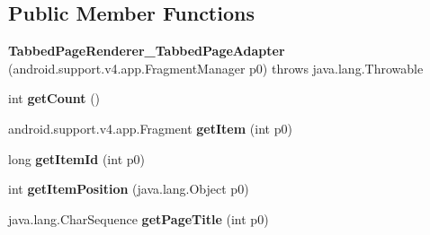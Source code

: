 \subsection*{Public Member Functions}
\begin{DoxyCompactItemize}
\item 
\hypertarget{classmd5eb25e0c6f853c9e5104b7654c9dc6cdf_1_1TabbedPageRenderer__TabbedPageAdapter_a1cabd962fd31ae12c29e786f239e9d92}{}{\bfseries Tabbed\+Page\+Renderer\+\_\+\+Tabbed\+Page\+Adapter} (android.\+support.\+v4.\+app.\+Fragment\+Manager p0)  throws java.\+lang.\+Throwable 	\label{classmd5eb25e0c6f853c9e5104b7654c9dc6cdf_1_1TabbedPageRenderer__TabbedPageAdapter_a1cabd962fd31ae12c29e786f239e9d92}

\item 
\hypertarget{classmd5eb25e0c6f853c9e5104b7654c9dc6cdf_1_1TabbedPageRenderer__TabbedPageAdapter_af9472693b63b54f3935d3908c0be6a4f}{}int {\bfseries get\+Count} ()\label{classmd5eb25e0c6f853c9e5104b7654c9dc6cdf_1_1TabbedPageRenderer__TabbedPageAdapter_af9472693b63b54f3935d3908c0be6a4f}

\item 
\hypertarget{classmd5eb25e0c6f853c9e5104b7654c9dc6cdf_1_1TabbedPageRenderer__TabbedPageAdapter_a366e624bc8695f0582694d0515734f99}{}android.\+support.\+v4.\+app.\+Fragment {\bfseries get\+Item} (int p0)\label{classmd5eb25e0c6f853c9e5104b7654c9dc6cdf_1_1TabbedPageRenderer__TabbedPageAdapter_a366e624bc8695f0582694d0515734f99}

\item 
\hypertarget{classmd5eb25e0c6f853c9e5104b7654c9dc6cdf_1_1TabbedPageRenderer__TabbedPageAdapter_a0a6745a3c83dc338511bb06436ac3e73}{}long {\bfseries get\+Item\+Id} (int p0)\label{classmd5eb25e0c6f853c9e5104b7654c9dc6cdf_1_1TabbedPageRenderer__TabbedPageAdapter_a0a6745a3c83dc338511bb06436ac3e73}

\item 
\hypertarget{classmd5eb25e0c6f853c9e5104b7654c9dc6cdf_1_1TabbedPageRenderer__TabbedPageAdapter_adc664be31e121cc5453d0b1e85a1c154}{}int {\bfseries get\+Item\+Position} (java.\+lang.\+Object p0)\label{classmd5eb25e0c6f853c9e5104b7654c9dc6cdf_1_1TabbedPageRenderer__TabbedPageAdapter_adc664be31e121cc5453d0b1e85a1c154}

\item 
\hypertarget{classmd5eb25e0c6f853c9e5104b7654c9dc6cdf_1_1TabbedPageRenderer__TabbedPageAdapter_ab49d16e770ac07c2556d34e489f072f6}{}java.\+lang.\+Char\+Sequence {\bfseries get\+Page\+Title} (int p0)\label{classmd5eb25e0c6f853c9e5104b7654c9dc6cdf_1_1TabbedPageRenderer__TabbedPageAdapter_ab49d16e770ac07c2556d34e489f072f6}


\end{DoxyCompactItemize}
